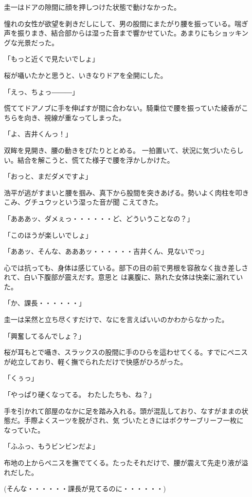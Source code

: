 ﻿\documentclass[book,tate]{jlreq}
\begin{document}
圭一はドアの隙間に顔を押しつけた状態で動けなかった。

憧れの女性が欲望を剥きだしにして、男の股間にまたがり腰を振っている。喘ぎ声を振りまき、結合部からは湿った音まで響かせていた。あまりにもショッキングな光景だった。

「もっと近くで見たいでしょ」

桜が囁いたかと思うと、いきなりドアを全開にした。

「えっ、ちょっ―――」

慌ててドアノブに手を伸ばすが間に合わない。騎乗位で腰を振っていた綾香がこちらを向き、視線が重なってしまった。

「よ、吉井くんっ！」

双眸を見開き、腰の動きをぴたりととめる。 一拍置いて、状況に気づいたらしい。結合を解こうと、慌てた様子で腰を浮かしかけた。

「おっと、まだダメですよ」

浩平が逃がすまいと腰を掴み、真下から股間を突きあげる。勢いよく肉柱を叩きこみ、グチュウッという湿った音が聞 こえてきた。

「あああッ、ダメぇっ・・・・・・ど、どういうことなの？」

「このほうが楽しいでしょ」

「ああッ、そんな、あああッ・・・・・・吉井くん、見ないでっ」

心では抗っても、身体は感じている。部下の目の前で男根を容赦なく抜き差しされて、白い下腹部が震えだす。意思と は裏腹に、熟れた女体は快楽に溺れていた。

「か、課長・・・・・・」

圭一は呆然と立ち尽くすだけで、なにを言えばいいのかわからなかった。

「興奮してるんでしょ？」

桜が耳もとで囁き、スラックスの股間に手のひらを這わせてくる。すでにペニスが屹立しており、軽く撫でられただけで快感がひろがった。

「くぅっ」

「やっぱり硬くなってる。 わたしたちも、ね？」

手を引かれて部屋のなかに足を踏み入れる。頭が混乱しており、なすがままの状態だ。手際よくスーツを脱がされ、気 づいたときにはボクサーブリーフ一枚になっていた。

「ふふっ、もうビンビンだよ」

布地の上からペニスを撫でてくる。たったそれだけで、腰が震えて先走り液が溢れだした。

(そんな・・・・・・課長が見てるのに・・・・・・)
\end{document}
